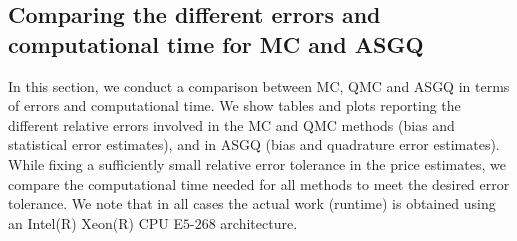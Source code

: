 %	
%
%
\FloatBarrier


\subsection{Comparing the different  errors and computational time for MC and ASGQ}\label{sec:Comparing different  errors and complexity for MC and MISC}
In this section, we conduct a comparison between MC, QMC and ASGQ in terms of errors and computational time. We show tables and plots reporting  the different relative errors involved in the MC and QMC  methods (bias and statistical error  estimates), and in ASGQ (bias and quadrature error estimates).  While fixing  a  sufficiently small relative error tolerance in the price estimates,  we  compare the computational time needed for all methods to meet the desired error tolerance.  We note that  in all cases the actual work (runtime) is obtained using an Intel(R) Xeon(R) CPU E$5$-$268$ architecture. 

